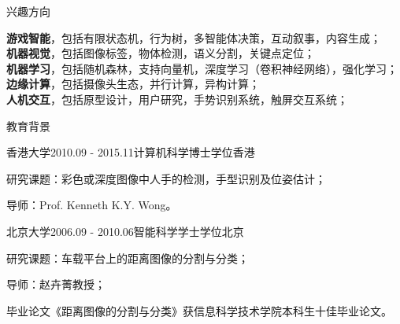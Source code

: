 \documentclass[UTF8]{cv_professional-cn} %
\begin{document}

\begin{rSection}{兴趣方向}

{\bf 游戏智能}，包括有限状态机，行为树，多智能体决策，互动叙事，内容生成；\\
{\bf 机器视觉}，包括图像标签，物体检测，语义分割，关键点定位；\\
{\bf 机器学习}，包括随机森林，支持向量机，深度学习（卷积神经网络），强化学习； \\
{\bf 边缘计算}，包括摄像头生态，并行计算，异构计算；\\
{\bf 人机交互}，包括原型设计，用户研究，手势识别系统，触屏交互系统； 

\end{rSection}


\begin{rSection}{教育背景}

\begin{rSubsection}{香港大学}{2010.09 - 2015.11}{计算机科学博士学位}{香港}
	\item 研究课题：彩色或深度图像中人手的检测，手型识别及位姿估计；
	\item 导师：Prof. Kenneth K.Y. Wong。
\end{rSubsection}

\begin{rSubsection}{北京大学}{2006.09 - 2010.06}{智能科学学士学位}{北京}
	\item 研究课题：车载平台上的距离图像的分割与分类；
	\item 导师：赵卉菁教授；
	\item 毕业论文《距离图像的分割与分类》获信息科学技术学院本科生十佳毕业论文。
\end{rSubsection}
\end{rSection}

\end{document}

